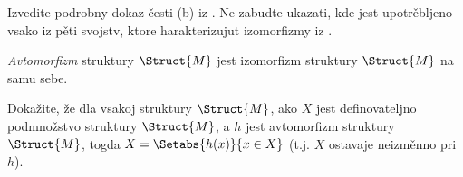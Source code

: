 \documentclass[../../../include/open-logic-section]{subfiles}
\begin{document}
\begin{prob}
Izvedite podrobny dokaz česti (b) iz
. Ne zabudte ukazati, kde jest
upotrěbljeno vsako iz pěti svojstv, ktore harakterizujut izomorfizmy
iz .
\end{prob}

\begin{defn}
\emph{Avtomorfizm} struktury $\Struct{M}$ jest izomorfizm struktury
$\Struct{M}$ na samu sebe.
\end{defn}

\begin{prob}
Dokažite, že dla vsakoj struktury $\Struct{M}$, ako $X$ jest
definovateljno podmnožstvo struktury $\Struct{M}$, a $h$ jest
avtomorfizm struktury $\Struct{M}$, togda $X = \Setabs{h(x)}{x \in X}$
(t.j. $X$ ostavaje neizměnno pri $h$).
\end{prob}
\end{document}
